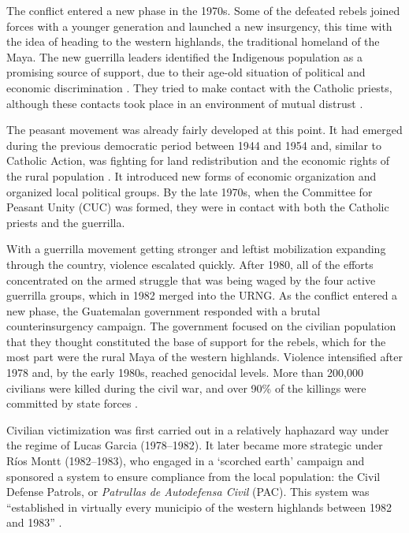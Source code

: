 \documentclass[12pt, notitlepage]{article}
\begin{document}
The conflict entered a new phase in the 1970s.
Some of the defeated rebels joined forces with a younger generation and launched a new insurgency, this time with the idea of heading to the western highlands, the traditional homeland of the Maya.
The new guerrilla leaders identified the Indigenous population as a promising source of support, due to their age-old situation of political and economic discrimination \citep{Payeras:1981aa, Arias:1992aa}.
They tried to make contact with the Catholic priests, although these contacts took place in an environment of mutual distrust \citep[e.g.][]{Manz:2004aa}.

The peasant movement was already fairly developed at this point.
It had emerged during the previous democratic period between 1944 and 1954 and, similar to Catholic Action, was fighting for land redistribution and the economic rights of the rural population \citep{Handy:1994aa, Forster:2001aa}.
It introduced new forms of economic organization and organized local political groups.
By the late 1970s, when the Committee for Peasant Unity (CUC) was formed, they were in contact with both the Catholic priests and the guerrilla.

With a guerrilla movement getting stronger and leftist mobilization expanding through the country, violence escalated quickly.
After 1980, all of the efforts concentrated on the armed struggle that was being waged by the four active guerrilla groups, which in 1982 merged into the URNG.
As the conflict entered a new phase, the Guatemalan government responded with a brutal counterinsurgency campaign.
The government focused on the civilian population that they thought constituted the base of support for the rebels, which for the most part were the rural Maya of the western highlands.
Violence intensified after 1978 and, by the early 1980s, reached genocidal levels.
More than 200,000 civilians were killed during the civil war, and over 90\% of the killings were committed by state forces \citep{Ball:1999aa, CEH:1999aa}.

Civilian victimization was first carried out in a relatively haphazard way under the regime of Lucas Garcia (1978--1982).
It later became more strategic under Ríos Montt (1982--1983), who engaged in a `scorched earth' campaign and sponsored a system to ensure compliance from the local population: the Civil Defense Patrols, or \textit{Patrullas de Autodefensa Civil} (PAC).
This system was ``established in virtually every municipio of the western highlands between 1982 and 1983'' \citep[272]{Smith:1990ab}.
\end{document}
